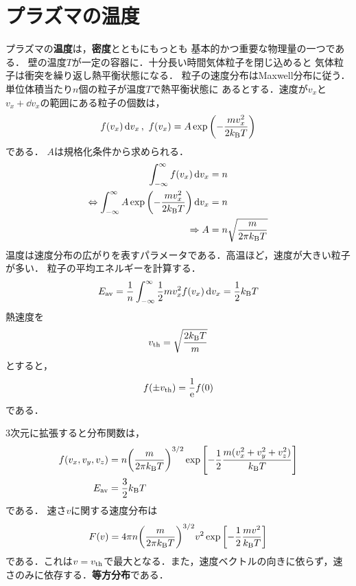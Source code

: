 \documentclass{report}
\begin{document}
\section{プラズマの温度}
  プラズマの\textbf{温度}は，\textbf{密度}とともにもっとも
  基本的かつ重要な物理量の一つである．
  壁の温度$T$が一定の容器に．十分長い時間気体粒子を閉じ込めると
  気体粒子は衝突を繰り返し熱平衡状態になる．
  粒子の速度分布はMaxwell分布に従う．単位体積当たり$n$個の粒子が温度$T$で熱平衡状態に
  あるとする．速度が$v_x$と$v_x + \dd{v_x}$の範囲にある粒子の個数は，
  \begin{align}
    f(v_x)\dd{v_x},\ f(v_x) = A \exp\qty(-\frac{mv_x^2}{2k_{\mathrm{B}} T})
  \end{align}
  である．
  $A$は規格化条件から求められる．
  \begin{align}
    \int_{-\infty}^{\infty} f(v_x) \dd{v_x} &= n \\
    \Leftrightarrow \int_{-\infty}^{\infty} A \exp\qty(-\frac{mv_x^2}{2k_{\mathrm{B}} T})\dd{v_x} &= n \\ 
    \Rightarrow A &= n\sqrt{\frac{m}{2\pi k_{\mathrm{B}} T}}
  \end{align}
  温度は速度分布の広がりを表すパラメータである．高温ほど，速度が大きい粒子が多い．
  粒子の平均エネルギーを計算する．
  \begin{align}
    E_{\mathrm{av}} = \frac{1}{n}\int_{-\infty}^{\infty} \frac{1}{2}mv_x^2f(v_x) \dd{v_x} = \frac{1}{2}k_{\mathrm{B}} T
  \end{align}
  熱速度を
  \begin{align}
    v_{\mathrm{th}} = \sqrt{\frac{2k_{\mathrm{B}} T}{m}}
  \end{align}
  とすると，
  \begin{align}
    f(\pm v_{\mathrm{th}}) = \frac{1}{\mathrm{e}}f(0)
  \end{align}
  である．
  \par
  3次元に拡張すると分布関数は，
  \begin{align}
    f(v_x, v_y, v_z) &= n\qty(\frac{m}{2\pi k_{\mathrm{B}} T})^{3/2} \exp\qty[-\frac{1}{2}\frac{m(v_x^2 + v_y^2 + v_z^2)}{k_{\mathrm{B}} T}]\\
    E_{\mathrm{av}} &= \frac{3}{2}k_{\mathrm{B}} T
  \end{align}
  である．
  速さ$v$に関する速度分布は
  \begin{align}
    F(v) = 4\pi n \qty(\frac{m}{2\pi k_{\mathrm{B}} T})^{3/2} v^2 \exp\qty[-\frac{1}{2}\frac{mv^2}{k_{\mathrm{B}} T}]
  \end{align}
  である．これは$v = v_{\mathrm{th}}$で最大となる．また，速度ベクトルの向きに依らず，速さのみに依存する．\textbf{等方分布}である．
  \par
\end{document}
